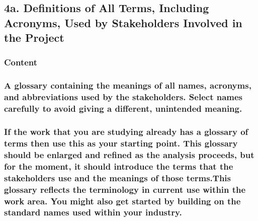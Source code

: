 \documentclass[
]{article}
\begin{document}
\hypertarget{a.-definitions-of-all-terms-including-acronyms-used-by-stakeholders-involved-in-the-project}{%
\subsection{4a. Definitions of All Terms, Including Acronyms, Used by
Stakeholders Involved in the
Project}\label{a.-definitions-of-all-terms-including-acronyms-used-by-stakeholders-involved-in-the-project}}

\hypertarget{content-18}{%
\subsubsection{Content}\label{content-18}}

\hypertarget{a-glossary-containing-the-meanings-of-all-names-acronyms-and-abbreviations-used-by-the-stakeholders.-select-names-carefully-to-avoid-giving-a-different-unintended-meaning.}{%
\subsubsection{A glossary containing the meanings of all names,
acronyms, and abbreviations used by the stakeholders. Select names
carefully to avoid giving a different, unintended
meaning.}\label{a-glossary-containing-the-meanings-of-all-names-acronyms-and-abbreviations-used-by-the-stakeholders.-select-names-carefully-to-avoid-giving-a-different-unintended-meaning.}}

\hypertarget{if-the-work-that-you-are-studying-already-has-a-glossary-of-terms-then-use-this-as-your-starting-point.-this-glossary-should-be-enlarged-and-refined-as-the-analysis-proceeds-but-for-the-moment-it-should-introduce-the-terms-that-the-stakeholders-use-and-the-meanings-of-those-terms.this-glossary-reflects-the-terminology-in-current-use-within-the-work-area.-you-might-also-get-started-by-building-on-the-standard-names-used-within-your-industry.}{%
\subsubsection{If the work that you are studying already has a glossary
of terms then use this as your starting point. This glossary should be
enlarged and refined as the analysis proceeds, but for the moment, it
should introduce the terms that the stakeholders use and the meanings of
those terms.This glossary reflects the terminology in current use within
the work area. You might also get started by building on the standard
names used within your
industry.}\label{if-the-work-that-you-are-studying-already-has-a-glossary-of-terms-then-use-this-as-your-starting-point.-this-glossary-should-be-enlarged-and-refined-as-the-analysis-proceeds-but-for-the-moment-it-should-introduce-the-terms-that-the-stakeholders-use-and-the-meanings-of-those-terms.this-glossary-reflects-the-terminology-in-current-use-within-the-work-area.-you-might-also-get-started-by-building-on-the-standard-names-used-within-your-industry.}}
\end{document}
